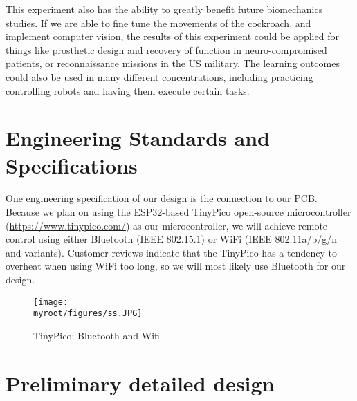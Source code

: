 \documentclass[twocolumn,10pt]{IEEEtran}
\newcommand{\myroot}{.}
\begin{document}
This experiment also has the ability to greatly benefit future biomechanics studies. If we are able to fine tune the movements of the cockroach, and implement computer vision, the results of this experiment could be applied for things like prosthetic design and recovery of function in neuro-compromised patients, or reconnaissance missions in the US military. The learning outcomes could also be used in many different concentrations, including practicing controlling robots and having them execute certain tasks. 

\section{Engineering Standards and Specifications}
One engineering specification of our design is the connection to our PCB. Because we plan on using the ESP32-based TinyPico open-source microcontroller (\url{https://www.tinypico.com/}) as our microcontroller, we will achieve remote control using either Bluetooth (IEEE 802.15.1) or WiFi (IEEE 802.11a/b/g/n and variants). Customer reviews indicate that the TinyPico has a tendency to overheat when using WiFi too long, so we will most likely use Bluetooth for our design.
\begin{figure}[ht!]
\centering
\texttt{[image: \\myroot/figures/ss.JPG]}
\caption{TinyPico: Bluetooth and Wifi}
\label{fig:ss}
\end{figure}




\section{Preliminary detailed design}
\end{document}
